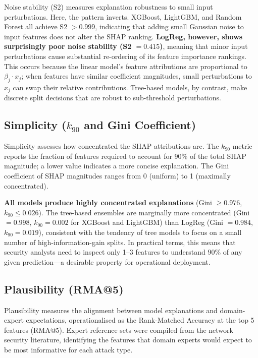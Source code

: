 \documentclass[12pt,a4paper]{report}
\begin{document}
Noise stability (S2) measures explanation robustness to small input perturbations. Here, the pattern inverts. XGBoost, LightGBM, and Random Forest all achieve S2 $> 0.999$, indicating that adding small Gaussian noise to input features does not alter the SHAP ranking. \textbf{LogReg, however, shows surprisingly poor noise stability (S2 $= 0.415$)}, meaning that minor input perturbations cause substantial re-ordering of its feature importance rankings. This occurs because the linear model's feature attributions are proportional to $\beta_j \cdot x_j$; when features have similar coefficient magnitudes, small perturbations to $x_j$ can swap their relative contributions. Tree-based models, by contrast, make discrete split decisions that are robust to sub-threshold perturbations.

\subsection{Simplicity ($k_{90}$ and Gini Coefficient)}
\label{sec:simp-results}

Simplicity assesses how concentrated the SHAP attributions are. The $k_{90}$ metric reports the fraction of features required to account for 90\% of the total SHAP magnitude; a lower value indicates a more concise explanation. The Gini coefficient of SHAP magnitudes ranges from 0 (uniform) to 1 (maximally concentrated).

\textbf{All models produce highly concentrated explanations} (Gini $\geq 0.976$, $k_{90} \leq 0.026$). The tree-based ensembles are marginally more concentrated (Gini $= 0.998$, $k_{90} = 0.002$ for XGBoost and LightGBM) than LogReg (Gini $= 0.984$, $k_{90} = 0.019$), consistent with the tendency of tree models to focus on a small number of high-information-gain splits. In practical terms, this means that security analysts need to inspect only 1--3 features to understand 90\% of any given prediction---a desirable property for operational deployment.

\subsection{Plausibility (RMA@5)}
\label{sec:plaus-results}

Plausibility measures the alignment between model explanations and domain-expert expectations, operationalised as the Rank-Matched Accuracy at the top 5 features (RMA@5). Expert reference sets were compiled from the network security literature, identifying the features that domain experts would expect to be most informative for each attack type.
\end{document}
